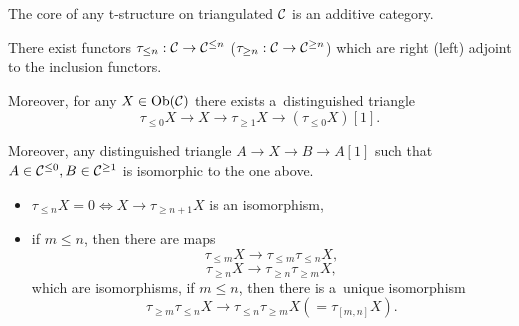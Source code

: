     \begin{theorem}
        The core of any t-structure on triangulated $\mathcal{C}$ 
        is an additive category.
    \end{theorem}
    
    \begin{lemma}
        There exist functors $\tau_{\leq n} : \mathcal{C} \to \mathcal{C}^{\leq n}$
        ($\tau_{\geq n}:\mathcal{C} \to \mathcal{C}^{\geq n}$)
        which are right (left) adjoint to the inclusion functors.
        
        Moreover, for any $X \in \operatorname{Ob}(\mathcal{C})$ there exists a~distinguished triangle
        $$\tau_{\leq0}X \to X \to \tau_{\geq1}X \to (\tau_{\leq 0}X)[1].$$
        
        Moreover, any distinguished triangle $A \to X \to B \to A[1]$
        such that $A \in \mathcal{C}^{\leq 0}, B \in \mathcal{C}^{\geq 1}$
        is isomorphic to the one above.
    \end{lemma}
    
    \begin{lemma}
        \begin{itemize}
            \item $\tau_{\leq n} X = 0 \iff X \to \tau_{\geq n+1} X$
            is an isomorphism,
            \item if $m \leq n$, then there are maps
            $$\tau_{\leq m} X \to \tau_{\leq m} \tau_{\leq n} X,$$
            $$\tau_{\geq n} X \to \tau_{\geq n} \tau_{\geq m} X,$$
            which are isomorphisms,
            if $m \leq n$, then there is a~unique isomorphism
            $$\tau_{\geq m} \tau_{\leq n} X 
            \to \tau_{\leq n} \tau_{\geq m} X (= \tau_{[m,n]} X).$$
        \end{itemize}
    \end{lemma}


 
 
